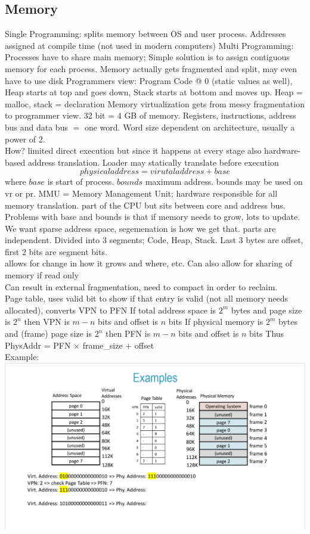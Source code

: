 \documentclass[8pt]{article}
\begin{document}
\subsection*{Memory}
Single Programming: splits memory between OS and user process. Addresses assigned at compile time (not used in modern computers)
Multi Programming: Processes have to share main memory; Simple solution is to assign contiguous memory for each process.
Memory actually gets fragmented and split, may even have to use disk
Programmers view: Program Code @ 0 (static values as well), Heap starts at top and goes down, Stack starts at bottom and moves up. Heap = malloc, stack = declaration
Memory virtualization gets from messy fragmentation to programmer view.
32 bit = 4 GB of memory. Registers, instructions, address bus and data bus $=$ one word. Word size dependent on architecture, usually a power of 2.
\\
How? limited direct execution but since it happens at every stage also hardware-based address translation. Loader may statically translate before execution
$$physical address = virutal address + base$$ where $base$ is start of process. $bounds$ maximum address. bounds may be used on vr or pr.
MMU = Memory Management Unit; hardware responsible for all memory translation. part of the CPU but sits between core and address bus.
Problems with base and bounds is that if memory needs to grow, lots to update.
We want sparse address space, segemenation is how we get that. parts are independent. Divided into 3 segments; Code, Heap, Stack.
Last 3 bytes are offset, first 2 bits are segment bits. \\
allows for change in how it grows and where, etc. Can also allow for sharing of memory if read only\\
Can result in external fragmentation, need to compact in order to reclaim.
\\
Page table, uses valid bit to show if that entry is valid (not all memory needs allocated), converts VPN to PFN
If total address space is $2^m$ bytes and page size is $2^n$ then VPN is $m-n$ bits and offset is $n$ bits
If physical memory is $2^m$ bytes and (frame) page size is $2^n$ then PFN is $m-n$ bits and offset is $n$ bits
Thus PhysAddr = PFN $\times$ frame\_size $+$ offset
\\
Example:
\includegraphics[scale=0.25]{VirtualMemoryExample1.png}
\end{document}
